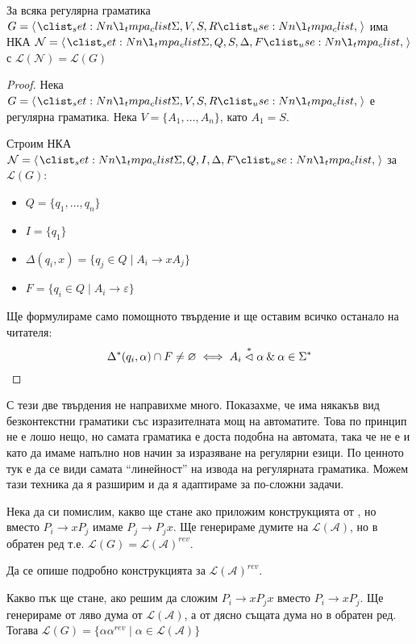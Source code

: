 \begin{claim}
    За всяка регулярна граматика $G = \opair{\Sigma, V, S, R}$ има НКА $\mathcal{N} = \opair{\Sigma, Q, S, \Delta, F}$ с $\mathcal{L(N)} = \mathcal{L}(G)$
\end{claim}

\begin{proof}
    Нека $G = \opair{\Sigma, V, S, R}$ е регулярна граматика.
    Нека $V = \{ A_1, \dots, A_n \}$, като $A_1 = S$.

    Строим НКА $\mathcal{N} = \opair{\Sigma, Q, I, \Delta, F}$ за $\mathcal{L}(G)$:
    \begin{itemize}
        \item $Q = \{ q_1, \dots, q_n \}$
        \item $I = \{ q_ 1 \} $
        \item $\Delta(q_i, x) = \{ q_j \in Q \mid A_i \rightarrow x A_j \}$
        \item $F = \{ q_i \in Q \mid A_i \rightarrow \varepsilon \}$
    \end{itemize}

    Ще формулираме само помощното твърдение и ще оставим всичко останало на читателя:
    \[
        \Delta^*({q_i}, \alpha) \cap F \neq \varnothing \iff A_i \stackrel{*}{\vartriangleleft} \alpha \: \& \: \alpha \in \Sigma^*
    \]
\end{proof}

С тези две твърдения не направихме много.
Показахме, че има някакъв вид безконтекстни граматики със изразителната мощ на автоматите.
Това по принцип не е лошо нещо, но самата граматика е доста подобна на автомата, така че не е и като да имаме напълно нов начин за изразяване на регулярни езици.
По ценното тук е да се види самата ``линейност'' на извода на регулярната граматика.
Можем тази техника да я разширим и да я адаптираме за по-сложни задачи.

Нека да си помислим, какво ще стане ако приложим конструкцията от , но вместо $P_i \rightarrow x P_j$ имаме $P_j \rightarrow P_j x$.
Ще генерираме думите на $\mathcal{L(A)}$, но в обратен ред т.е. $\mathcal{L}(G) = \mathcal{L(A)}^{rev}$.

\begin{problem}
Да се опише подробно конструкцията за $\mathcal{L(A)}^{rev}$.
\end{problem}

Какво пък ще стане, ако решим да сложим $P_i \rightarrow x P_j x$ вместо $P_i \rightarrow x P_j$.
Ще генерираме от ляво дума от $\mathcal{L(A)}$, а от дясно същата дума но в обратен ред.
Тогава $\mathcal{L}(G) = \{ \alpha \alpha^{rev} \mid \alpha \in \mathcal{L(A)} \}$

